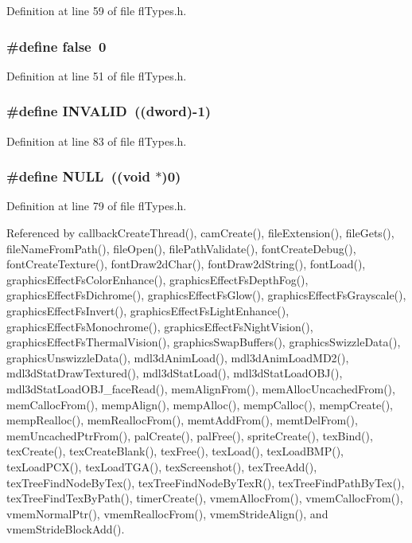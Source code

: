 Definition at line 59 of file fl\-Types.h.
\subsubsection{\setlength{\rightskip}{0pt plus 5cm}\#define false~0}\label{flTypes_8h_65e9886d74aaee76545e83dd09011727}




Definition at line 51 of file fl\-Types.h.
\subsubsection{\setlength{\rightskip}{0pt plus 5cm}\#define INVALID~(({\bf dword})-1)}\label{flTypes_8h_df770fe2eec438e3758ffe905dbae208}




Definition at line 83 of file fl\-Types.h.
\subsubsection{\setlength{\rightskip}{0pt plus 5cm}\#define NULL~((void $\ast$)0)}\label{flTypes_8h_070d2ce7b6bb7e5c05602aa8c308d0c4}




Definition at line 79 of file fl\-Types.h.

Referenced by callback\-Create\-Thread(), cam\-Create(), file\-Extension(), file\-Gets(), file\-Name\-From\-Path(), file\-Open(), file\-Path\-Validate(), font\-Create\-Debug(), font\-Create\-Texture(), font\-Draw2d\-Char(), font\-Draw2d\-String(), font\-Load(), graphics\-Effect\-Fs\-Color\-Enhance(), graphics\-Effect\-Fs\-Depth\-Fog(), graphics\-Effect\-Fs\-Dichrome(), graphics\-Effect\-Fs\-Glow(), graphics\-Effect\-Fs\-Grayscale(), graphics\-Effect\-Fs\-Invert(), graphics\-Effect\-Fs\-Light\-Enhance(), graphics\-Effect\-Fs\-Monochrome(), graphics\-Effect\-Fs\-Night\-Vision(), graphics\-Effect\-Fs\-Thermal\-Vision(), graphics\-Swap\-Buffers(), graphics\-Swizzle\-Data(), graphics\-Unswizzle\-Data(), mdl3d\-Anim\-Load(), mdl3d\-Anim\-Load\-MD2(), mdl3d\-Stat\-Draw\-Textured(), mdl3d\-Stat\-Load(), mdl3d\-Stat\-Load\-OBJ(), mdl3d\-Stat\-Load\-OBJ\_\-face\-Read(), mem\-Align\-From(), mem\-Alloc\-Uncached\-From(), mem\-Calloc\-From(), memp\-Align(), memp\-Alloc(), memp\-Calloc(), memp\-Create(), memp\-Realloc(), mem\-Realloc\-From(), memt\-Add\-From(), memt\-Del\-From(), mem\-Uncached\-Ptr\-From(), pal\-Create(), pal\-Free(), sprite\-Create(), tex\-Bind(), tex\-Create(), tex\-Create\-Blank(), tex\-Free(), tex\-Load(), tex\-Load\-BMP(), tex\-Load\-PCX(), tex\-Load\-TGA(), tex\-Screenshot(), tex\-Tree\-Add(), tex\-Tree\-Find\-Node\-By\-Tex(), tex\-Tree\-Find\-Node\-By\-Tex\-R(), tex\-Tree\-Find\-Path\-By\-Tex(), tex\-Tree\-Find\-Tex\-By\-Path(), timer\-Create(), vmem\-Alloc\-From(), vmem\-Calloc\-From(), vmem\-Normal\-Ptr(), vmem\-Realloc\-From(), vmem\-Stride\-Align(), and vmem\-Stride\-Block\-Add().
